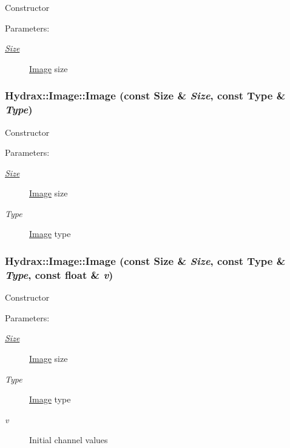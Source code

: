 \begin{CompactItemize}
Constructor \begin{Desc}
\item[Parameters:]
\begin{description}
\item[{\em \hyperlink{struct_hydrax_1_1_size}{Size}}]\hyperlink{class_hydrax_1_1_image}{Image} size \end{description}
\end{Desc}
\hypertarget{class_hydrax_1_1_image_964018639ef80bf7274ec3eb564bc5e1}{
\subsubsection[{Image}]{\setlength{\rightskip}{0pt plus 5cm}Hydrax::Image::Image (const {\bf Size} \& {\em Size}, \/  const {\bf Type} \& {\em Type})}}
\label{class_hydrax_1_1_image_964018639ef80bf7274ec3eb564bc5e1}


Constructor \begin{Desc}
\item[Parameters:]
\begin{description}
\item[{\em \hyperlink{struct_hydrax_1_1_size}{Size}}]\hyperlink{class_hydrax_1_1_image}{Image} size \item[{\em Type}]\hyperlink{class_hydrax_1_1_image}{Image} type \end{description}
\end{Desc}
\hypertarget{class_hydrax_1_1_image_3ebb813438f174afb0a2034df4103ced}{
\subsubsection[{Image}]{\setlength{\rightskip}{0pt plus 5cm}Hydrax::Image::Image (const {\bf Size} \& {\em Size}, \/  const {\bf Type} \& {\em Type}, \/  const float \& {\em v})}}
\label{class_hydrax_1_1_image_3ebb813438f174afb0a2034df4103ced}


Constructor \begin{Desc}
\item[Parameters:]
\begin{description}
\item[{\em \hyperlink{struct_hydrax_1_1_size}{Size}}]\hyperlink{class_hydrax_1_1_image}{Image} size \item[{\em Type}]\hyperlink{class_hydrax_1_1_image}{Image} type \item[{\em v}]Initial channel values \end{description}
\end{Desc}
\hypertarget{class_hydrax_1_1_image_326c283842e93944fabea025b26a50f7}{
}
\end{CompactItemize}
